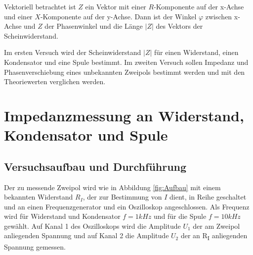 \documentclass{scrartcl}
\begin{document}
Vektoriell betrachtet ist $Z$ ein Vektor mit einer $R$-Komponente auf der x-Achse und einer $X$-Komponente auf der y-Achse. Dann ist der Winkel $\varphi$ zwischen x-Achse und $Z$ der Phasenwinkel und die Länge $|Z|$ des Vektors der Scheinwiderstand.

Im ersten Versuch wird der Scheinwiderstand $|Z|$ für einen Widerstand, einen Kondensator und eine Spule bestimmt. Im zweiten Versuch sollen Impedanz und Phasenverschiebung eines unbekannten Zweipols bestimmt werden und mit den Theoriewerten verglichen werden.
\section{Impedanzmessung an Widerstand, Kondensator und Spule}
\subsection{Versuchsaufbau und Durchführung}
Der zu messende Zweipol wird wie in Abbildung \ref{fig:Aufbau} mit einem bekannten Widerstand $R_{I}$, der zur Bestimmung von $I$ dient, in Reihe geschaltet und an einen Frequenzgenerator und ein Oszilloskop angeschlossen. Als Frequenz wird für Widerstand und Kondensator $f = 1kHz$ und für die Spule $f = 10kHz$ gewählt. Auf Kanal 1 des Oszilloskops wird die Amplitude $U_{1}$ der am Zweipol anliegenden Spannung und auf Kanal 2 die Amplitude $U_{2}$ der an R\textsubscript{I} anliegenden Spannung gemessen. 
\end{document}
